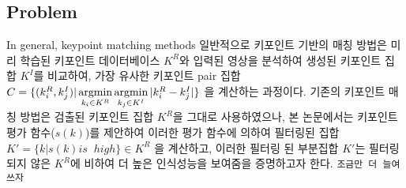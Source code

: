 
\subsection{Problem}
In general, keypoint matching methods 
일반적으로 키포인트 기반의 매칭 방법은 미리 학습된 키포인트 데이터베이스 $K^R$와 입력된 영상을 분석하여 생성된 키포인트 집합 $K^I$를 비교하여, 가장 유사한 키포인트 pair 집합 $C = \{(k_i^R, k_j^I) | \operatorname*{argmin}\limits_{k_i\in K^R}  \operatorname*{argmin}\limits_{k_j\in K^I} | k_i^R - k_j^I | \}$ 을 계산하는 과정이다. 기존의 키포인트 매칭 방법은 검출된 키포인트 집합 $K^R$을 그대로 사용하였으나, 본 논문에서는 키포인트 평가 함수($s(k)$)를 제안하여 이러한 평가 함수에 의하여 필터링된 집합 $K' = \{ k | s(k) is\;\; high \} \in K^R$ 을 계산하고, 이러한 필터링 된 부분집합 $K'$는 필터링 되지 않은 $K^R$에 비하여 더 높은 인식성능을 보여줌을 증명하고자 한다. \texttt{조금만 더 늘여쓰자}